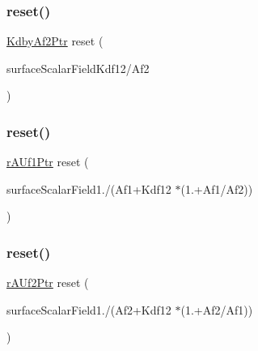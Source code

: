 \mbox{\label{pEqnf__2p_8H_a5a0dd54c80692ad662a75f8203a47f15}} 
\subsubsection{\texorpdfstring{reset()}{reset()}\hspace{0.1cm}{\footnotesize\ttfamily [2/4]}}
{\footnotesize\ttfamily \hyperlink{pEqnf__2p_8H_a2ada986b644f6ca4d3739c7cd72db448}{Kdby\+Af2\+Ptr} reset (\begin{DoxyParamCaption}\item[{new }]{surface\+Scalar\+FieldKdf12/\+Af2 }\end{DoxyParamCaption})}

\mbox{\label{pEqnf__2p_8H_a608e33c95cb391d714ea0d61f73c22d1}} 
\subsubsection{\texorpdfstring{reset()}{reset()}\hspace{0.1cm}{\footnotesize\ttfamily [3/4]}}
{\footnotesize\ttfamily \hyperlink{pEqnf__2p_8H_a45cd567de66687731018bd57ba4895b4}{r\+A\+Uf1\+Ptr} reset (\begin{DoxyParamCaption}\item[{new }]{surface\+Scalar\+Field1./(\+Af1+\+Kdf12 $\ast$(1.+\+Af1/\+Af2)) }\end{DoxyParamCaption})}

\mbox{\label{pEqnf__2p_8H_ac7e3c444c6631a56dd742955ee4c3e2a}} 
\subsubsection{\texorpdfstring{reset()}{reset()}\hspace{0.1cm}{\footnotesize\ttfamily [4/4]}}
{\footnotesize\ttfamily \hyperlink{pEqnf__2p_8H_afd2f9cb3bfb4ff4a3ca384fedd285ec9}{r\+A\+Uf2\+Ptr} reset (\begin{DoxyParamCaption}\item[{new }]{surface\+Scalar\+Field1./(\+Af2+\+Kdf12 $\ast$(1.+\+Af2/\+Af1)) }\end{DoxyParamCaption})}

